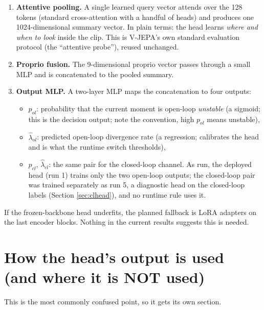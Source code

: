 \documentclass[11pt]{article}
\begin{document}
\begin{enumerate}[leftmargin=2em]
  \item \textbf{Attentive pooling.} A single learned query vector attends over the
        128 tokens (standard cross-attention with a handful of heads) and produces
        one 1024-dimensional summary vector. In plain terms: the head learns
        \emph{where and when to look} inside the clip. This is V-JEPA's own
        standard evaluation protocol (the ``attentive probe''), reused unchanged.
  \item \textbf{Proprio fusion.} The 9-dimensional proprio vector passes through a
        small MLP and is concatenated to the pooled summary.
  \item \textbf{Output MLP.} A two-layer MLP maps the concatenation to four
        outputs:
        \begin{itemize}[leftmargin=1.5em]
          \item $p_{ol}$: probability that the current moment is open-loop
                \emph{unstable} (a sigmoid; this is the decision output; note
                the convention, high $p_{ol}$ means unstable),
          \item $\hat\lambda_{ol}$: predicted open-loop divergence rate
                (a regression; calibrates the head and is what the runtime
                switch thresholds),
          \item $p_{cl}$, $\hat\lambda_{cl}$: the same pair for the closed-loop
                channel. As run, the deployed head (run 1) trains only the two
                open-loop outputs; the closed-loop pair was trained separately
                as run 5, a diagnostic head on the closed-loop labels
                (Section \ref{sec:clhead}), and no runtime rule uses it.
        \end{itemize}
\end{enumerate}

If the frozen-backbone head underfits, the planned fallback is LoRA adapters on the
last encoder blocks. Nothing in the current results suggests this is needed.

\section{How the head's output is used (and where it is NOT used)}

This is the most commonly confused point, so it gets its own section.
\end{document}
